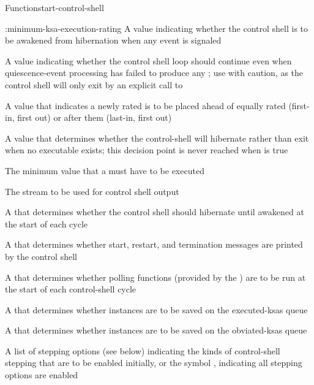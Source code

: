 \documentclass[10pt,twoside,english,pdftex]{article}
\begin{document}
\begin{functiondoc}{Function}{start-control-shell}
\begin{keywords}{:minimum-ksa-execution-rating}
   A  value indicating
  whether the control shell is to be awakened from hibernation when any event
  is signaled

   A  value
  indicating whether the control shell loop should continue even when
  quiescence-event processing has failed to produce any
  ; use with caution, as the control shell will only
  exit by an explicit call to 

   A  value that
  indicates a newly rated  is to be placed ahead of equally
  rated  (first-in, first out) or after them (last-in, first out)

   A  value that
  determines whether the control-shell will hibernate rather than exit when no
  executable  exists; this decision point is never reached when
   is true

   The minimum  value
  that a  must have to be executed

   The stream to be used for control shell 
  output

  \keyword[:pause] A  that determines
  whether the control shell should hibernate until awakened at the
  start of each cycle

  \keyword[:print] A  that determines
  whether start, restart, and termination messages are printed by the
  control shell 

   A  that
  determines whether polling functions (provided by the
  )
  are to be run at the start of each control-shell cycle

   A  that determines
  whether  instances are to be saved on the executed-ksas
  queue

   A  that determines
  whether  instances are to be saved on the obviated-ksas
  queue

  \keyword[:stepping] A list of stepping options (see below) indicating the
  kinds of control-shell stepping that are to be enabled initially, or the
  symbol , indicating all stepping options are enabled


\end{keywords}
\end{functiondoc}
\end{document}
